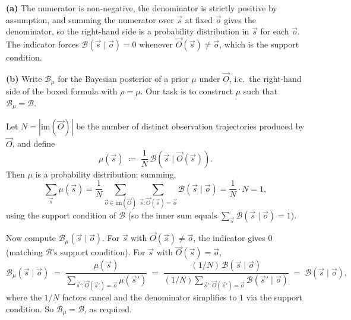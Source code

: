 \documentclass[11pt]{article}
\newcommand{\cB}{\mathcal{B}}
\begin{document}
\begin{solution}
\textbf{(a)} The numerator is non-negative, the denominator is strictly
positive by assumption, and summing the numerator over $\vec s$ at fixed
$\vec o$ gives the denominator, so the right-hand side is a probability
distribution in $\vec s$ for each $\vec o$. The indicator forces
$\cB(\vec s \mid \vec o) = 0$ whenever $\vec O(\vec s) \ne \vec o$, which
is the support condition.

\textbf{(b)} Write $\cB_\mu$ for the Bayesian posterior of a prior $\mu$
under $\vec O$, i.e.\ the right-hand side of the boxed formula with
$\rho = \mu$. Our task is to construct $\mu$ such that $\cB_\mu = \cB$.

Let $N = |\mathrm{im}(\vec O)|$ be the number of distinct observation
trajectories produced by $\vec O$, and define
$$
\mu(\vec s) \;\coloneqq\; \frac{1}{N}\, \cB(\vec s \mid \vec O(\vec s)).
$$
Then $\mu$ is a probability distribution: summing,
$$
\sum_{\vec s} \mu(\vec s)
= \frac{1}{N} \sum_{\vec o \in \mathrm{im}(\vec O)} \sum_{\vec s : \vec O(\vec s) = \vec o} \cB(\vec s \mid \vec o)
= \frac{1}{N} \cdot N = 1,
$$
using the support condition of $\cB$ (so the inner sum equals
$\sum_{\vec s} \cB(\vec s \mid \vec o) = 1$).

Now compute $\cB_\mu(\vec s \mid \vec o)$. For $\vec s$ with
$\vec O(\vec s) \ne \vec o$, the indicator gives $0$ (matching $\cB$'s
support condition). For $\vec s$ with $\vec O(\vec s) = \vec o$,
$$
\cB_\mu(\vec s \mid \vec o)
\;=\; \frac{\mu(\vec s)}{\sum_{\vec s' : \vec O(\vec s') = \vec o} \mu(\vec s')}
\;=\; \frac{(1/N)\,\cB(\vec s \mid \vec o)}{(1/N) \sum_{\vec s' : \vec O(\vec s') = \vec o} \cB(\vec s' \mid \vec o)}
\;=\; \cB(\vec s \mid \vec o),
$$
where the $1/N$ factors cancel and the denominator simplifies to $1$ via
the support condition. So $\cB_\mu = \cB$, as required.
\end{solution}

\end{document}
